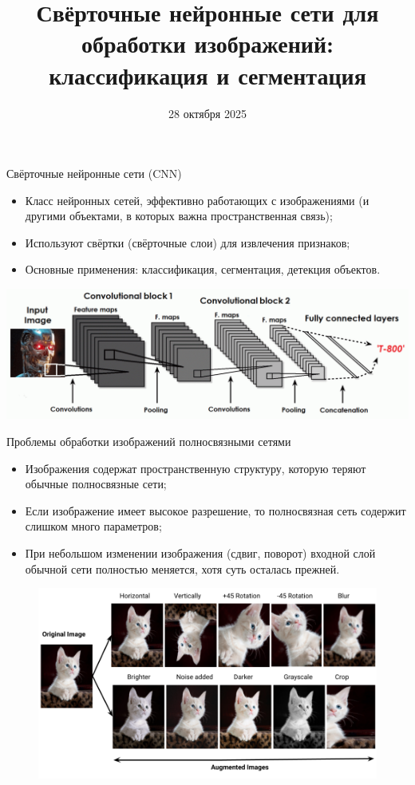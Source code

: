\documentclass[notheorems, handout]{beamer}
\title[Нейронные сети для изображений]{Свёрточные нейронные сети для обработки изображений: классификация и сегментация}
\institute[Санкт-Петербургский Государственный Университет]{%
  \small
  Санкт-Петербургский государственный университет\\
  Кафедра статистического моделирования
}
\date{28 октября 2025}
\begin{document}
\begin{frame}
    \titlepage
\end{frame}

\begin{frame}{Свёрточные нейронные сети (CNN)}
    \begin{itemize}
        \item Класс нейронных сетей, эффективно работающих с изображениями (и другими объектами, в которых важна пространственная связь);
        \item Используют свёртки (свёрточные слои) для извлечения признаков;
        \item Основные применения: классификация, сегментация, детекция объектов.
    \end{itemize}
    \includegraphics[width=\linewidth]{img/conv_nn.png}
\end{frame}

\begin{frame}{Проблемы обработки изображений полносвязными сетями}
    \begin{itemize}
        \item Изображения содержат пространственную структуру, которую теряют обычные полносвязные сети;
        \item Если изображение имеет высокое разрешение, то полносвязная сеть содержит слишком много параметров;
        \item При небольшом изменении изображения (сдвиг, поворот) входной слой обычной сети полностью меняется, хотя суть осталась прежней.
    \end{itemize}
    \begin{figure}
        \includegraphics[width=0.7\linewidth]{img/augmentation.png}
    \end{figure}
\end{frame}
\end{document}
